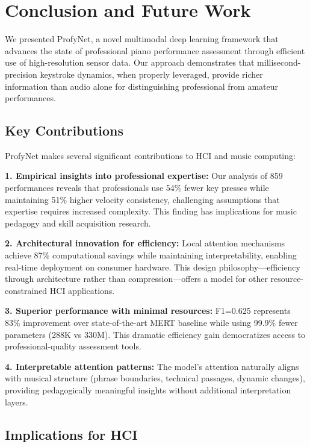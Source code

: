 \section{Conclusion and Future Work}

We presented ProfyNet, a novel multimodal deep learning framework that advances the state of professional piano performance assessment through efficient use of high-resolution sensor data. Our approach demonstrates that millisecond-precision keystroke dynamics, when properly leveraged, provide richer information than audio alone for distinguishing professional from amateur performances.

\subsection{Key Contributions}

ProfyNet makes several significant contributions to HCI and music computing:

\textbf{1. Empirical insights into professional expertise:} Our analysis of 859 performances reveals that professionals use 54\% fewer key presses while maintaining 51\% higher velocity consistency, challenging assumptions that expertise requires increased complexity. This finding has implications for music pedagogy and skill acquisition research.

\textbf{2. Architectural innovation for efficiency:} Local attention mechanisms achieve 87\% computational savings while maintaining interpretability, enabling real-time deployment on consumer hardware. This design philosophy—efficiency through architecture rather than compression—offers a model for other resource-constrained HCI applications.

\textbf{3. Superior performance with minimal resources:} F1=0.625 represents 83\% improvement over state-of-the-art MERT baseline while using 99.9\% fewer parameters (288K vs 330M). This dramatic efficiency gain democratizes access to professional-quality assessment tools.

\textbf{4. Interpretable attention patterns:} The model's attention naturally aligns with musical structure (phrase boundaries, technical passages, dynamic changes), providing pedagogically meaningful insights without additional interpretation layers.

\subsection{Implications for HCI}

